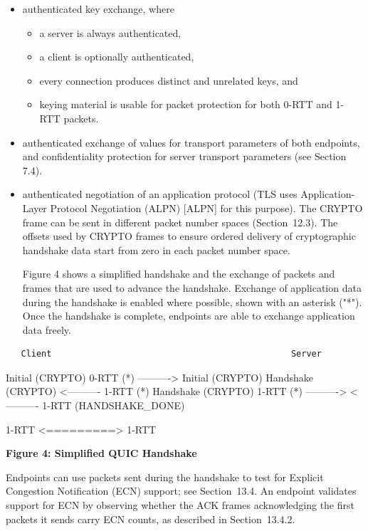 \documentclass{article}
\begin{document}
\begin{itemize}
\item authenticated key exchange, where
\begin{itemize}
\item a server is always authenticated,
\item a client is optionally authenticated,
\item every connection produces distinct and unrelated keys, and
\item keying material is usable for packet protection for both 0-RTT and 1-RTT packets.
\end{itemize}
\item authenticated exchange of values for transport parameters of both endpoints, and confidentiality protection for server transport parameters (see Section 7.4).
\item authenticated negotiation of an application protocol (TLS uses Application-Layer Protocol Negotiation (ALPN) [ALPN] for this purpose).
The CRYPTO frame can be sent in different packet number spaces (Section~12.3).  The offsets used by CRYPTO frames to ensure ordered delivery of cryptographic handshake data start from zero in each packet number space.

Figure 4 shows a simplified handshake and the exchange of packets and frames that are used to advance the handshake.  Exchange of application data during the handshake is enabled where possible, shown with an asterisk ("*").  Once the handshake is complete, endpoints are able to exchange application data freely.

\end{itemize}
\begin{verbatim}
   Client                                               Server
\end{verbatim}

Initial (CRYPTO) 0-RTT (*)              ----------> Initial (CRYPTO) Handshake (CRYPTO) <----------                1-RTT (*) Handshake (CRYPTO) 1-RTT (*)              ----------> <----------   1-RTT (HANDSHAKE\_DONE)

1-RTT                  <=========>                    1-RTT

\begin{center}
\textbf{Figure 4: Simplified QUIC Handshake}
\end{center}

Endpoints can use packets sent during the handshake to test for Explicit Congestion Notification (ECN) support; see Section~13.4.  An endpoint validates support for ECN by observing whether the ACK frames acknowledging the first packets it sends carry ECN counts, as described in Section~13.4.2.
\end{document}
